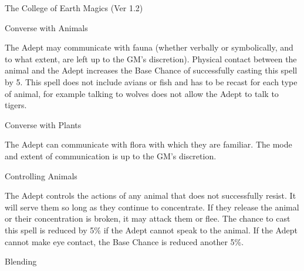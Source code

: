 \begin{Chapter}{The College of Earth Magics (Ver 1.2)}
\begin{spell}[G-1]{Converse with Animals}

\begin{effects}
The Adept may communicate with fauna (whether verbally or
symbolically, and to what extent, are left up to the GM’s discretion).
Physical contact between the animal and the Adept increases the Base
Chance of successfully casting this spell by 5.  This spell does not
include avians or fish and has to be recast for each type of animal,
for example talking to wolves does not allow the Adept to talk to
tigers.

\end{effects}
\end{spell}

\begin{spell}[G-2]{Converse with Plants}

\begin{effects}
The Adept can communicate with flora with which they are familiar. The
mode and extent of communication is up to the GM’s discretion.

\end{effects}
\end{spell}

\begin{spell}[G-3]{Controlling Animals}

\begin{effects}
The Adept controls the actions of any animal that does not
successfully resist.  It will serve them so long as they continue to
concentrate.  If they release the animal or their concentration is
broken, it may attack them or flee.  The chance to cast this spell is
reduced by 5\% if the Adept cannot speak to the animal. If the Adept
cannot make eye contact, the Base Chance is reduced another 5\%.

\end{effects}
\end{spell}

\begin{spell}[G-4]{Blending}


\end{spell}
\end{Chapter}
